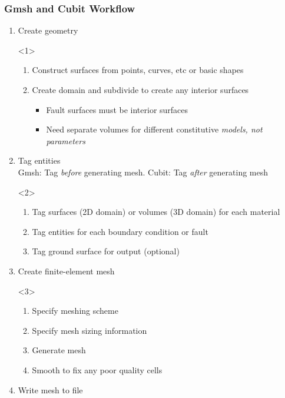 \documentclass[aspectratio=169]{beamer}
\begin{document}
\begin{frame}[t]
  \frametitle{Gmsh and Cubit Workflow}
  \summary{}

  \begin{enumerate}
  \item Create geometry
    \begin{onlyenv}<1>
      \begin{enumerate}
      \item Construct surfaces from points, curves, etc or basic shapes
      \item Create domain and subdivide to create any interior surfaces
        \begin{itemize}
        \item Fault surfaces must be interior surfaces
        \item Need separate volumes for different constitutive {\em models, not parameters}
        \end{itemize}
      \end{enumerate}
    \end{onlyenv}
  \item Tag entities\\
    Gmsh: Tag {\em before} generating mesh. Cubit: Tag {\em after} generating mesh
    \begin{onlyenv}<2>
      \begin{enumerate}
      \item Tag surfaces (2D domain) or volumes (3D domain) for each material
      \item Tag entities for each boundary condition or fault
      \item Tag ground surface for output (optional)
      \end{enumerate}
    \end{onlyenv}
  \item Create finite-element mesh
    \begin{onlyenv}<3>
      \begin{enumerate}
      \item Specify meshing scheme
      \item Specify mesh sizing information
      \item Generate mesh
      \item Smooth to fix any poor quality cells
      \end{enumerate}
    \end{onlyenv}
  \item Write mesh to file
  \end{enumerate}

\end{frame}
\end{document}
